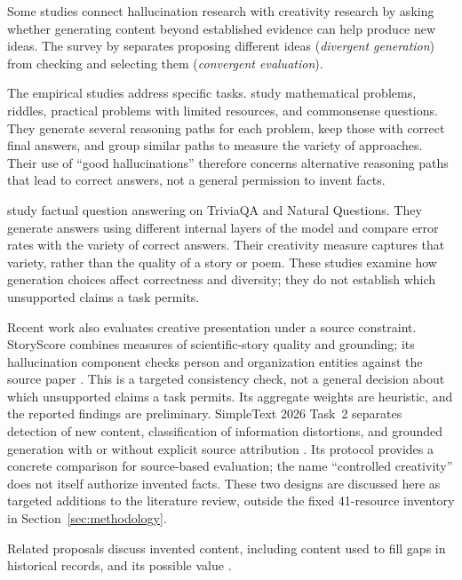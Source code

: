 \documentclass{clv2025}
\begin{document}
Some studies connect hallucination research with creativity research by
asking whether generating content beyond established evidence can help
produce new ideas. The survey by \citet{jiang_survey_2024} separates
proposing different ideas (\emph{divergent generation}) from checking and
selecting them (\emph{convergent evaluation}).

The empirical studies address specific tasks. \citet{sun_hallucinating_2024}
study mathematical problems, riddles, practical problems with limited
resources, and commonsense questions. They generate several reasoning paths
for each problem, keep those with correct final answers, and group similar
paths to measure the variety of approaches. Their use of ``good
hallucinations'' therefore concerns alternative reasoning paths that lead
to correct answers, not a general permission to invent facts.

\citet{he_shakespearean_2025} study factual question answering on TriviaQA
and Natural Questions. They generate answers using different internal
layers of the model and compare error rates with the variety of correct
answers. Their creativity measure captures that variety, rather than the
quality of a story or poem. These studies examine how generation choices
affect correctness and diversity; they do not establish which unsupported
claims a task permits.

Recent work also evaluates creative presentation under a source constraint.
StoryScore combines measures of scientific-story quality and grounding; its
hallucination component checks person and organization entities against the
source paper \citep{argese_storyscore_2026}. This is a targeted consistency
check, not a general decision about which unsupported claims a task permits.
Its aggregate weights are heuristic, and the reported findings are preliminary.
SimpleText 2026 Task~2 separates detection of new content, classification of
information distortions, and grounded generation with or without explicit
source attribution \citep{simpletext_task2_2026}. Its protocol provides a
concrete comparison for source-based evaluation; the name ``controlled
creativity'' does not itself authorize invented facts. These two designs
are discussed here as targeted additions to the literature review, outside
the fixed 41-resource inventory in Section~\ref{sec:methodology}.

Related proposals discuss invented content, including content used to fill
gaps in historical records, and its possible value
\citep{sui_confabulation_2024,sui_critical_2025,yang_hicbench_2025}.
\end{document}
